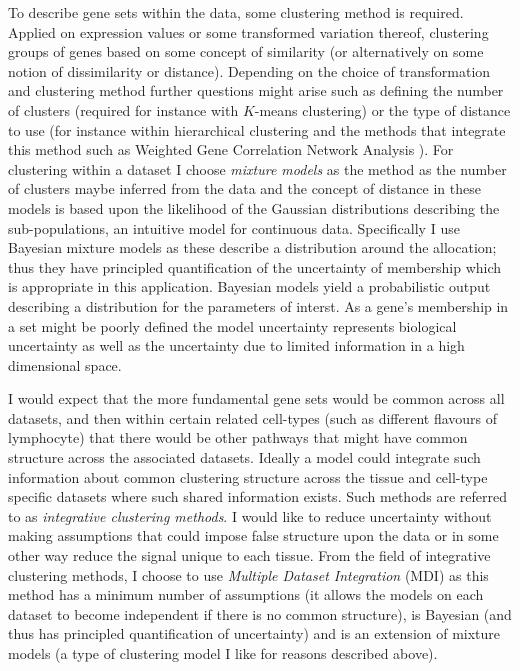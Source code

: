 \documentclass[12pt]{article} %
\begin{document}
	To describe gene sets within the data, some clustering method is required. Applied on expression values or some transformed variation thereof, clustering groups of genes based on some concept of similarity (or alternatively on some notion of dissimilarity or distance). Depending on the choice of transformation and clustering method further questions might arise such as defining the number of clusters (required for instance with $K$-means clustering) or the type of distance to use (for instance within hierarchical clustering and the methods that integrate this method such as Weighted Gene Correlation Network Analysis \citep{zhang2005general}). For clustering within a dataset I choose \emph{mixture models} as the method as the number of clusters maybe inferred from the data and the concept of distance in these models is based upon the likelihood of the Gaussian distributions describing the sub-populations, an intuitive model for continuous data. Specifically I use Bayesian mixture models as these describe a distribution around the allocation; thus they have principled quantification of the uncertainty of membership which is appropriate in this application. Bayesian models yield a probabilistic output describing a distribution for the parameters of interst. As a gene's membership in a set might be poorly defined \citep{Pita-JuarezPathwayCoexpressionNetwork2018} the model uncertainty represents biological uncertainty as well as the uncertainty due to limited information in a high dimensional space.
	
	I would expect that the more fundamental gene sets would be common across all datasets, and then within certain related cell-types (such as different flavours of lymphocyte) that there would be other pathways that might have common structure across the associated datasets. Ideally a model could integrate such information about common clustering structure across the tissue and cell-type specific datasets where such shared information exists. Such methods are referred to as \emph{integrative clustering methods}. I would like to reduce uncertainty without making assumptions that could impose false structure upon the data or in some other way reduce the signal unique to each tissue. From the field of integrative clustering methods, I choose to use \emph{Multiple Dataset Integration} (MDI) \citep{KirkBayesiancorrelatedclustering2012} as this method has a minimum number of assumptions (it allows the models on each dataset to become independent if there is no common structure), is Bayesian (and thus has principled quantification of uncertainty) and is an extension of mixture models (a type of clustering model I like for reasons described above).
	
\end{document}
